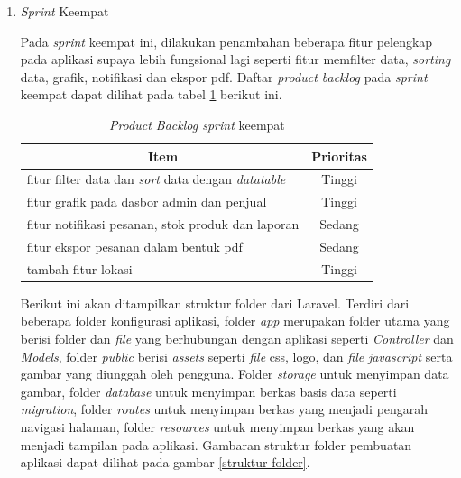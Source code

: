 \begin{enumerate}
	\item \textit{Sprint} Keempat
	\par Pada \textit{sprint} keempat ini, dilakukan penambahan beberapa fitur pelengkap pada aplikasi supaya lebih fungsional lagi seperti fitur memfilter data, \textit{sorting} data, grafik, notifikasi dan ekspor pdf. Daftar \textit{product backlog} pada \textit{sprint} keempat dapat dilihat pada tabel \ref*{tab:sprint keempat} berikut ini.

	\begin{table}[H]
		\begin{center}
		\caption{\textit{Product Backlog sprint} keempat}
		\label{tab:sprint keempat}
		\begin{tabular}{|l|c|}
		\hline
		\multicolumn{1}{|c|}{Item} & Prioritas\\
		\hline
		fitur filter data dan \textit{sort} data dengan \textit{datatable} & Tinggi\\
		\hline
		fitur grafik pada dasbor admin dan penjual & Tinggi\\
		\hline
		fitur notifikasi pesanan, stok produk dan laporan & Sedang\\
		\hline
		fitur ekspor pesanan dalam bentuk pdf & Sedang\\
		\hline
		tambah fitur lokasi & Tinggi\\
		\hline
		\end{tabular}
		\end{center}
	\end{table}

	\par Berikut ini akan ditampilkan struktur folder dari Laravel. Terdiri dari beberapa folder konfigurasi aplikasi, folder \textit{app} merupakan folder utama yang berisi folder dan \textit{file} yang berhubungan dengan aplikasi seperti \textit{Controller} dan \textit{Models}, folder \textit{public} berisi \textit{assets} seperti \textit{file} css, logo, dan \textit{file} \textit{javascript} serta gambar yang diunggah oleh pengguna. Folder \textit{storage} untuk menyimpan data gambar, folder \textit{database} untuk menyimpan berkas basis data seperti \textit{migration}, folder \textit{routes} untuk menyimpan berkas yang menjadi pengarah navigasi halaman, folder \textit{resources} untuk menyimpan berkas yang akan menjadi tampilan pada aplikasi. Gambaran struktur folder pembuatan aplikasi dapat dilihat pada gambar \ref*{struktur folder}.


\end{enumerate}
